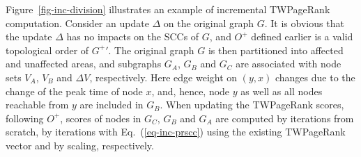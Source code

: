 

\begin{example} \label{eg-layer-dag}
Figure~\ref{fig-inc-division} illustrates an example of incremental TWPageRank computation. Consider an update $\Delta$ on the original graph $G$.
%
It is obvious that the update $\Delta$ has no impacts on the SCCs of $G$, and $O^+$ defined earlier is a valid topological order of $G^+{'}$.
%
The original graph $G$ is then partitioned into affected and unaffected areas, and subgraphs $G_A$, $G_B$ and $G_C$ are associated with node sets $V_A$, $V_B$ and $\Delta V$, respectively. Here edge weight on $(y, x)$ changes due to the change of the peak time of node $x$, and, hence, node $y$ as well as all nodes reachable from $y$ are included in $G_B$.
%
When updating the TWPageRank scores, following $O^+$, scores of nodes in $G_C$, $G_B$ and $G_A$ are computed by iterations from scratch, by iterations with Eq.~(\ref{eq-inc-prscc}) using the existing TWPageRank vector and by scaling, respectively.
\end{example}

